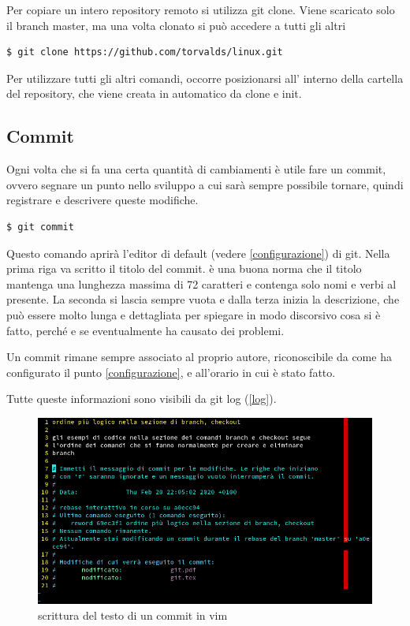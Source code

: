 \documentclass{article} \usepackage[textwidth=19cm,textheight=24cm]{geometry}
\begin{document}
Per copiare un intero repository remoto si utilizza git clone. Viene scaricato
solo il branch master, ma una volta clonato si può accedere a tutti gli altri

\begin{verbatim}
$ git clone https://github.com/torvalds/linux.git
\end{verbatim}

Per utilizzare tutti gli altri comandi, occorre posizionarsi all' interno della
cartella del repository, che viene creata in automatico da clone e init.

\subsection{Commit}

Ogni volta che si fa una certa quantità di cambiamenti è utile fare un commit,
ovvero segnare un punto nello sviluppo a cui sarà sempre possibile tornare,
quindi registrare e descrivere queste modifiche.

\begin{verbatim}
$ git commit
\end{verbatim}

Questo comando aprirà l'editor di default (vedere \ref{configurazione}) di git.
Nella prima riga va scritto il titolo del commit.
è una buona norma che il titolo mantenga una lunghezza massima di 72 caratteri
e contenga solo nomi e verbi al presente.
La seconda si lascia sempre vuota e dalla terza inizia la descrizione, che può essere
molto lunga e dettagliata per spiegare in modo discorsivo cosa si è fatto, 
perché e se eventualmente ha causato dei problemi.

Un commit rimane sempre associato al proprio autore, riconoscibile da come ha
configurato il punto \ref{configurazione}, e all'orario in cui è stato fatto.

Tutte queste informazioni sono visibili da git log (\ref{log}).

\begin{figure}
\includegraphics[width=6in]{img/vimEditCommit.png}
\centering
\caption{scrittura del testo di un commit in vim}
\end{figure}
\end{document}
